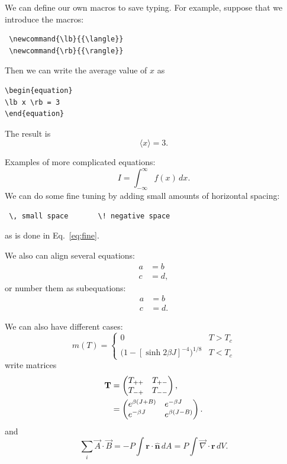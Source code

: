 \documentclass[12pt]{article}
\begin{document}
We can define our own macros to save typing. For example, suppose
that we introduce the macros:
\begin{verbatim}
 \newcommand{\lb}{{\langle}}
 \newcommand{\rb}{{\rangle}}
\end{verbatim}
\newcommand{\lb}{{\langle}}
\newcommand{\rb}{{\rangle}}
Then we can write the average value of $x$ as
\begin{verbatim}
\begin{equation}
\lb x \rb = 3
\end{equation}
\end{verbatim}
The result is
\begin{equation}
\lb x \rb = 3 .
\end{equation}

Examples of more complicated equations:
\begin{equation}
I = \! \int_{-\infty}^\infty f(x)\,dx \label{eq:fine}.
\end{equation}
We can do some fine tuning by adding small amounts of horizontal
spacing:
\begin{verbatim}
 \, small space       \! negative space
\end{verbatim}
as is done in Eq.~\eqref{eq:fine}.

We also can align several equations:
\begin{align}
a & = b \\
c &= d ,
\end{align}
or number them as subequations:
\begin{subequations}
\begin{align}
a & = b \\
c &= d .
\end{align}
\end{subequations}

We can also have different cases:
\begin{equation}
\label{eq:mdiv}
m(T) =
\begin{cases}
0 & \text{$T > T_c$} \\
\bigl(1 - [\sinh 2 \beta J]^{-4} \bigr)^{\! 1/8} & \text{$T < T_c$}
\end{cases}
\end{equation}
write matrices
\begin{align}
\textbf{T} &=
\begin{pmatrix}
T_{++} \hfill & T_{+-} \\
T_{-+} & T_{--} \hfill 
\end{pmatrix} , \nonumber \\
& =
\begin{pmatrix}
e^{\beta (J + B)} \hfill & e^{-\beta J} \hfill \\
e^{-\beta J} \hfill & e^{\beta (J - B)} \hfill
\end{pmatrix}.
\end{align}
and 
\newcommand{\rv}{\textbf{r}}
\begin{equation}
\sum_i \vec A \cdot \vec B = -P\!\int\! \rv \cdot
\hat{\mathbf{n}}\, dA = P\!\int \! {\vec \nabla} \cdot \rv\, dV.
\end{equation}
\end{document}
